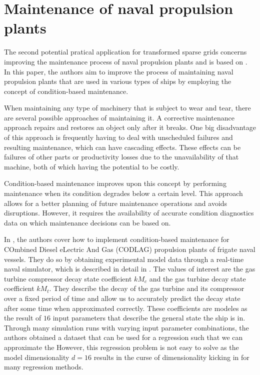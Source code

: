 \documentclass[
  a4paper,  %
  twoside,  %
  bibliography=totoc,
  headsepline,
  cleardoublepage=empty,
  parskip=half,
  draft=false
]{scrbook}
\begin{document}
\section{Maintenance of naval propulsion plants}

The second potential pratical application for transformed sparse grids concerns improving the maintenance process of naval propulsion plants and is based on \cite{Coraddu2016}.
In this paper, the authors aim to improve the process of maintaining naval propulsion plants that are used in various types of ships by employing the concept of condition-based maintenance.

When maintaining any type of machinery that is subject to wear and tear, there are several possible approaches of maintaining it.
A corrective maintenance approach repairs and restores an object only after it breaks.
One big disadvantage of this approach is frequently having to deal with unscheduled failures and resulting maintenance, which can have cascading effects.
These effects can be failures of other parts or productivity losses due to the unavailability of that machine, both of which having the potential to be costly.

Condition-based maintenance improves upon this concept by performing maintenance when its condition degrades below a certain level.
This approach allows for a better planning of future maintenance operations and avoids disruptions.
However, it requires the availability of accurate condition diagnostics data on which maintenance decisions can be based on.

In \cite{Coraddu2016}, the authors cover how to implement condition-based maintenance for COmbined Diesel eLectric And Gas (CODLAG) propulsion plants of frigate naval vessels.
They do so by obtaining experimental model data through a real-time naval simulator, which is described in detail in \cite{Altosole2009}.
The values of interest are the gas turbine compressor decay state coefficient $kM_c$ and the gas turbine decay state coefficient $kM_t$.
They describe the decay of the gas turbine and its compressor over a fixed period of time and allow us to accurately predict the decay state after some time when approximated correctly.
These coefficients are modeles as the result of $16$ input parameters that describe the general state the ship is in.
Through many simulation runs with varying input parameter combinations, the authors obtained a dataset that can be used for a regression such that we can approximate the 
However, this regression problem is not easy to solve as the model dimensionality $d=16$ results in the curse of dimensionality kicking in for many regression methods.
\end{document}
